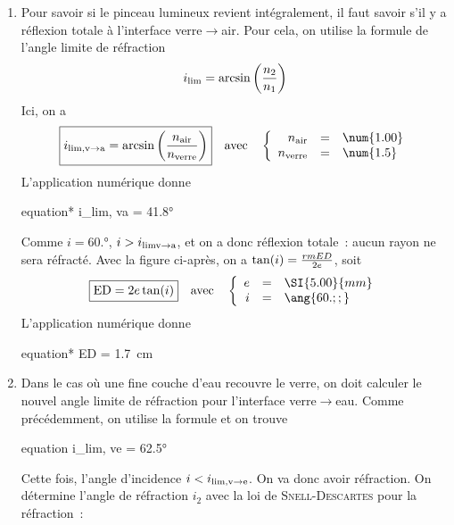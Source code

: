 \documentclass[../../main/main.tex]{subfiles}
\begin{document}
{\begin{enumerate}
		\item Pour savoir si le pinceau lumineux revient intégralement, il faut
		      savoir s'il y a réflexion totale à l'interface verre$\rightarrow$air.
		      Pour cela, on utilise la formule de l'angle limite de réfraction
		      \begin{equation*}
			      i_{\rm lim} = \arcsin \left( \frac{n_2}{n_1} \right)
		      \end{equation*}
		      Ici, on a
		      \[\boxed{i_{\rm lim, v\rightarrow a} =
				      \arcsin \left( \frac{n_{\rm air}}{n_{\rm verre}} \right)}
			      \quad\text{avec}\quad
			      \left\{
			      \begin{array}{rcl}
				      n_{\rm air}   & = & \num{1.00} \\
				      n_{\rm verre} & = & \num{1.5}
			      \end{array}
			      \right.
		      \]
		      L'application numérique donne
		      \begin{empheq}[box=\fbox]{equation*}
			      i_{\rm lim, v\rightarrow a} = \ang{41.8;;}
		      \end{empheq}
		      Comme $i = \ang{60.;;}$, $i > i_{\rm lim v\rightarrow a}$, et on a
		      donc réflexion totale~: aucun rayon ne sera réfracté.\bigbreak
		      Avec la figure ci-après, on a $\tan(i) = \frac{\\rm  ED}{2e}$, soit
		      \[\boxed{{\rm ED} = 2e\tan(i)}
			      \quad\text{avec}\quad
			      \left\{
			      \begin{array}{rcl}
				      e & = & \SI{5.00}{mm} \\
				      i & = & \ang{60.;;}
			      \end{array}
			      \right.\]
		      L'application numérique donne
		      \begin{empheq}[box=\fbox]{equation*}
			      ED = \SI{1.7}{cm}
		      \end{empheq}
		\item Dans le cas où une fine couche d'eau recouvre le verre, on doit
		      calculer le nouvel angle limite de réfraction pour l'interface
		      verre$\rightarrow$eau. Comme précédemment, on utilise la formule et on
		      trouve
		      \begin{empheq}[box=\fbox]{equation}
			      i_{\rm lim, v\rightarrow e} = \ang{62.5;;}
		      \end{empheq}
		      Cette fois, l'angle d'incidence $i < i_{\rm lim, v\rightarrow e}$. On
		      va donc avoir réfraction. On détermine l'angle de réfraction $i_2$
		      avec la loi de \textsc{Snell-Descartes} pour la réfraction~:

\end{enumerate}}
\end{document}
